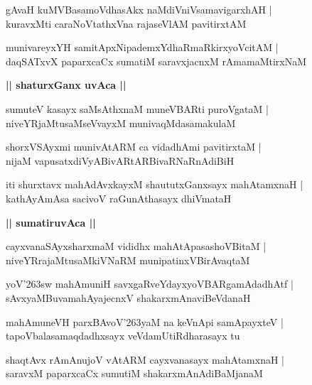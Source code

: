 \documentclass[twoside,12pt,openright]{book}
\def\S{\char'263}
\newcounter{shloka}[chapter]
\def\uvaca#1{\centerline{{\large\textbf{#1}}}}
\begin{document}
\begin{shloka}%
gAvaH kuMVBasamoVdhasAkx naMdiVniVsamavigarxhAH |\\
kuravxMti caraNoVtathxVna rajaseVlAM pavitirxtAM 
\end{shloka}

\begin{shloka}%
munivareyxYH samitApxNipademxYdhaRmaRkirxyoVcitAM |\\
daqSATxvX paparxcaCx sumatiM saravxjacnxM rAmamaMtirxNaM 
\end{shloka}

\uvaca{|| shaturxGanx uvAca ||}

\begin{shloka}%
sumuteV kasayx saMsAthxnaM muneVBARti puroVgataM |\\
niveYRjaMtusaMseVvayxM munivaqMdasamakulaM 
\end{shloka}

\begin{shloka}%
shorxVSAyxmi munivAtARM ca vidadhAmi pavitirxtaM |\\
nijaM vapusatxdiVyABivARtARBivaRNaRnAdiBiH 
\end{shloka}

\begin{shloka}%
iti shurxtavx mahAdAvxkayxM shaututxGanxsayx mahAtamxnaH |\\
kathAyAmAsa sacivoV raGunAthasayx dhiVmataH
\end{shloka}
\uvaca{|| sumatiruvAca ||}

\begin{shloka}%
cayxvanaSAyxsharxmaM vididhx mahAtApasashoVBitaM |\\
niveYRrajaMtusaMkiVNaRM munipatinxVBirAvaqtaM 
\end{shloka}

\begin{shloka}%
yoV\S sw mahAmuniH savxgaRveYdayxyoVBARgamAdadhAtf |\\
sAvxyaMBuvamahAyajecnxV shakarxmAnaviBeVdanaH
\end{shloka}

\begin{shloka}%
mahAmuneVH parxBAvoV\S yaM na keVnApi samApayxteV |\\
tapoVbalasamaqdadhxsayx veVdamUtiRdharasayx tu
\end{shloka}

\begin{shloka}%
shaqtAvx rAmAnujoV vAtARM cayxvanasayx mahAtamxnaH |\\
saravxM paparxcaCx sumutiM shakarxmAnAdiBaMjanaM 
\end{shloka}
\end{document}
